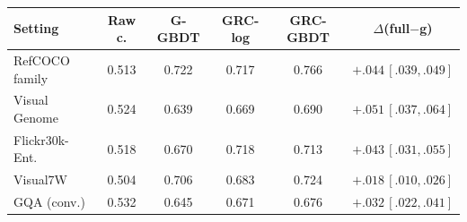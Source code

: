 \begin{tabular}{@{}lccccc@{}}
\toprule
Setting & Raw c. & G-GBDT & GRC-log & GRC-GBDT & $\Delta$(full$-$g) \\
\midrule
RefCOCO family & 0.513 & 0.722 & 0.717 & 0.766 & $+.044\,[.039,.049]$ \\
Visual Genome & 0.524 & 0.639 & 0.669 & 0.690 & $+.051\,[.037,.064]$ \\
Flickr30k-Ent. & 0.518 & 0.670 & 0.718 & 0.713 & $+.043\,[.031,.055]$ \\
Visual7W & 0.504 & 0.706 & 0.683 & 0.724 & $+.018\,[.010,.026]$ \\
GQA (conv.) & 0.532 & 0.645 & 0.671 & 0.676 & $+.032\,[.022,.041]$ \\
\bottomrule
\end{tabular}
